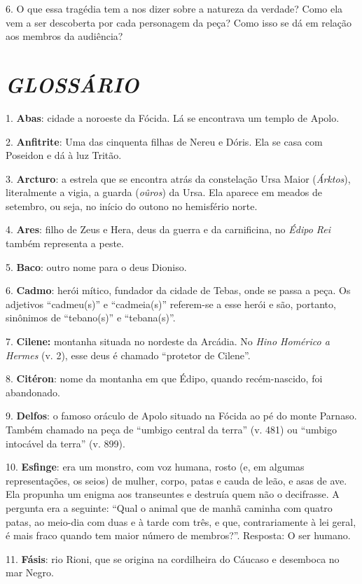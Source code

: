 6. O que essa tragédia tem a nos dizer sobre a natureza da verdade? Como
ela vem a ser descoberta por cada personagem da peça? Como isso se dá em
relação aos membros da audiência?

\chapter{\emph{GLOSSÁRIO}}

1. \textbf{Abas}: cidade a noroeste da Fócida. Lá se encontrava um
templo de Apolo.

2. \textbf{Anfitrite}: Uma das cinquenta filhas de Nereu e Dóris. Ela se
casa com Poseidon e dá à luz Tritão.

3. \textbf{Arcturo}: a estrela que se encontra atrás da constelação Ursa
Maior (\emph{Árktos}), literalmente a vigia, a guarda (\emph{oûros}) da
Ursa. Ela aparece em meados de setembro, ou seja, no início do outono no
hemisfério norte.

4. \textbf{Ares}: filho de Zeus e Hera, deus da guerra e da carnificina,
no \emph{Édipo Rei} também representa a peste.

5. \textbf{Baco}: outro nome para o deus Dioniso.

6. \textbf{Cadmo}: herói mítico, fundador da cidade de Tebas, onde se
passa a peça. Os adjetivos ``cadmeu(s)'' e ``cadmeia(s)'' referem-se a
esse herói e são, portanto, sinônimos de ``tebano(s)'' e ``tebana(s)''.

7. \textbf{Cilene:} montanha situada no nordeste da Arcádia. No
\emph{Hino Homérico a Hermes} (v. 2), esse deus é chamado ``protetor de
Cilene''.

8. \textbf{Citéron}: nome da montanha em que Édipo, quando
recém-nascido, foi abandonado.

9. \textbf{Delfos}: o famoso oráculo de Apolo situado na Fócida ao pé do
monte Parnaso. Também chamado na peça de ``umbigo central da terra'' (v.
481) ou ``umbigo intocável da terra'' (v. 899).

10. \textbf{Esfinge}: era um monstro, com voz humana, rosto (e, em
algumas representações, os seios) de mulher, corpo, patas e cauda de
leão, e asas de ave. Ela propunha um enigma aos transeuntes e destruía
quem não o decifrasse. A pergunta era a seguinte: ``Qual o animal que de
manhã caminha com quatro patas, ao meio-dia com duas e à tarde com três,
e que, contrariamente à lei geral, é mais fraco quando tem maior número
de membros?''. Resposta: O ser humano.

11. \textbf{Fásis}: rio Rioni, que se origina na cordilheira do Cáucaso
e desemboca no mar Negro.

